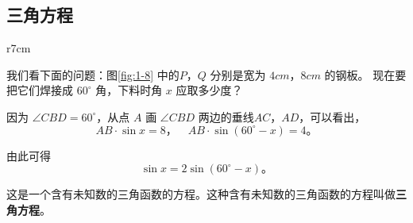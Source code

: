 \subsection{三角方程}\label{subsec:1-4}

\begin{wrapfigure}[13]{r}{7cm}
    \centering
    
    \caption{}\label{fig:1-8}
\end{wrapfigure}

我们看下面的问题：图\ref{fig:1-8} 中的$P$，$Q$ 分别是宽为 $4cm$，$8cm$ 的钢板。
现在要把它们焊接成 $60^\circ$ 角，下料时角 $x$ 应取多少度？

因为 $\angle CBD=60^\circ$，从点 $A$ 画 $\angle CBD$ 两边的垂线$AC$，$AD$，可以看出，
$$ AB \cdot \sin x = 8 \text{，} \quad AB \cdot \sin(60^\circ - x) = 4 \text{。}$$

由此可得
$$ \sin x = 2\sin(60^\circ - x) \text{。}$$

这是一个含有未知数的三角函数的方程。这种含有未知数的三角函数的方程叫做\textbf{三角方程}。

